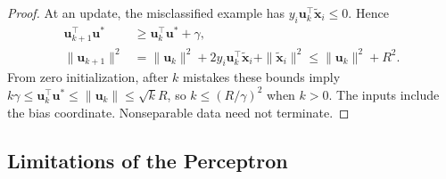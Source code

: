 \documentclass[11pt,twoside]{article}
\numberwithin{equation}{section}
\newcommand{\vect}[1]{\bm{#1}}
\theoremstyle{plain}
\theoremstyle{definition}
\theoremstyle{remark}
\begin{document}
\begin{proof}
At an update, the misclassified example has
$y_i\vect u_k^\top\tilde{\vect x}_i\le0$. Hence
\begin{align*}
\vect u_{k+1}^\top\vect u^*&\ge\vect u_k^\top\vect u^*+\gamma,\\
\|\vect u_{k+1}\|^2
&=\|\vect u_k\|^2+2y_i\vect u_k^\top\tilde{\vect x}_i+
 \|\tilde{\vect x}_i\|^2\le\|\vect u_k\|^2+R^2.
\end{align*}
From zero initialization, after $k$ mistakes these bounds imply
$k\gamma\le\vect u_k^\top\vect u^*\le\|\vect u_k\|
\le\sqrt{k}R$, so $k\le(R/\gamma)^2$ when $k>0$.
The inputs include the bias coordinate. Nonseparable data need not terminate.
\end{proof}

\subsection{Limitations of the Perceptron}
\end{document}
